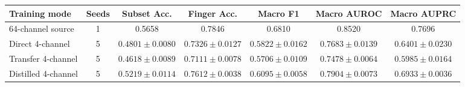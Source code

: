 \begin{tabular}{lcccccc}
\toprule
Training mode & Seeds & Subset Acc. & Finger Acc. & Macro F1 & Macro AUROC & Macro AUPRC \\
\midrule
64-channel source & 1 & 0.5658 & 0.7846 & 0.6810 & 0.8520 & 0.7696 \\
Direct 4-channel & 5 & $0.4801\pm0.0080$ & $0.7326\pm0.0127$ & $0.5822\pm0.0162$ & $0.7683\pm0.0139$ & $0.6401\pm0.0230$ \\
Transfer 4-channel & 5 & $0.4618\pm0.0089$ & $0.7111\pm0.0078$ & $0.5706\pm0.0109$ & $0.7478\pm0.0064$ & $0.5985\pm0.0164$ \\
Distilled 4-channel & 5 & $\mathbf{0.5219\pm0.0114}$ & $\mathbf{0.7612\pm0.0038}$ & $\mathbf{0.6095\pm0.0058}$ & $\mathbf{0.7904\pm0.0073}$ & $\mathbf{0.6933\pm0.0036}$ \\
\bottomrule
\end{tabular}
